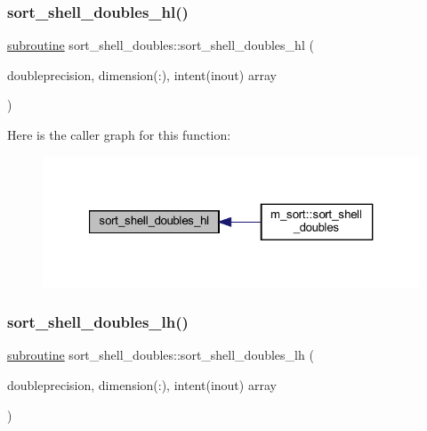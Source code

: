 \subsubsection{\texorpdfstring{sort\+\_\+shell\+\_\+doubles\+\_\+hl()}{sort\_shell\_doubles\_hl()}}
{\footnotesize\ttfamily \hyperlink{M__stopwatch_83_8txt_acfbcff50169d691ff02d4a123ed70482}{subroutine} sort\+\_\+shell\+\_\+doubles\+::sort\+\_\+shell\+\_\+doubles\+\_\+hl (\begin{DoxyParamCaption}\item[{doubleprecision, dimension(\+:), intent(inout)}]{array }\end{DoxyParamCaption})\hspace{0.3cm}{\ttfamily [private]}}

Here is the caller graph for this function\+:
\nopagebreak
\begin{figure}[H]
\begin{center}
\leavevmode
\includegraphics[width=321pt]{M__sort_8f90_a2710b2c0c881eed2f89f6bf5674f73bc_icgraph}
\end{center}
\end{figure}
\mbox{\label{M__sort_8f90_af2227448e8e0e9e8ebc698334dcbc72e}} 
\subsubsection{\texorpdfstring{sort\+\_\+shell\+\_\+doubles\+\_\+lh()}{sort\_shell\_doubles\_lh()}}
{\footnotesize\ttfamily \hyperlink{M__stopwatch_83_8txt_acfbcff50169d691ff02d4a123ed70482}{subroutine} sort\+\_\+shell\+\_\+doubles\+::sort\+\_\+shell\+\_\+doubles\+\_\+lh (\begin{DoxyParamCaption}\item[{doubleprecision, dimension(\+:), intent(inout)}]{array }\end{DoxyParamCaption})\hspace{0.3cm}{\ttfamily [private]}}

